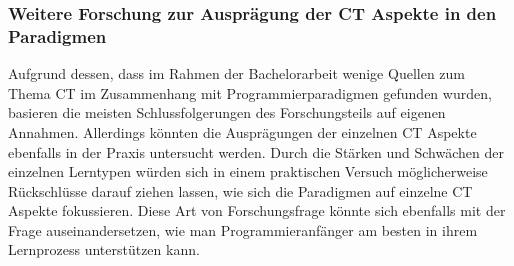\subsubsection{Weitere Forschung zur Ausprägung der CT Aspekte in den Paradigmen}
Aufgrund dessen, dass im Rahmen der Bachelorarbeit wenige Quellen zum Thema CT im Zusammenhang mit Programmierparadigmen gefunden wurden, basieren die meisten Schlussfolgerungen des Forschungsteils auf eigenen Annahmen. Allerdings könnten die Ausprägungen der einzelnen CT Aspekte ebenfalls in der Praxis untersucht werden.
Durch die Stärken und Schwächen der einzelnen Lerntypen würden sich in einem praktischen Versuch möglicherweise Rückschlüsse darauf ziehen lassen, wie sich die Paradigmen auf einzelne CT Aspekte fokussieren.
Diese Art von Forschungsfrage könnte sich ebenfalls mit der Frage auseinandersetzen, wie man Programmieranfänger am besten in ihrem Lernprozess unterstützen kann.
